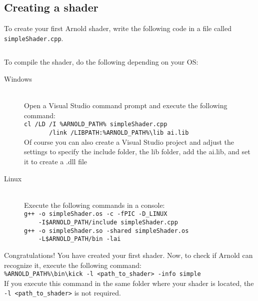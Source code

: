 \subsection{Creating a shader}

To create your first Arnold shader, write the following code in a file called \texttt{simpleShader.cpp}.

\inputminted[mathescape,
linenos,
numbersep=5pt,
frame=lines,
framesep=2mm,
baselinestretch=1,
fontsize=\footnotesize,
tabsize=3,
label=simpleShader.cpp]
{c++}{simpleShader.cpp}

To compile the shader, do the following depending on your OS:

\begin{description}

\item[Windows] \hfill \\
Open a Visual Studio command prompt and execute the following command:\\
\verb|cl /LD /I %ARNOLD_PATH% simpleShader.cpp|\\
\verb|       /link /LIBPATH:%ARNOLD_PATH%\lib ai.lib|\\
Of course you can also create a Visual Studio project and adjust the settings to specify the include folder, the lib folder, add the ai.lib, and set it to create a .dll file

\item[Linux] \hfill \\
Execute the following commands in a console:\\
\verb|g++ -o simpleShader.os -c -fPIC -D_LINUX|\\
\verb|    -I$ARNOLD_PATH/include simpleShader.cpp|\\
\verb|g++ -o simpleShader.so -shared simpleShader.os|\\
\verb|    -L$ARNOLD_PATH/bin -lai|\\

\end{description}

Congratulations! You have created your first shader. Now, to check if Arnold can recognize it, execute the following command:\\
\verb|%ARNOLD_PATH%\bin\kick -l <path_to_shader> -info simple|\\
If you execute this command in the same folder where your shader is located, the \verb|-l <path_to_shader>| is not required.\\

